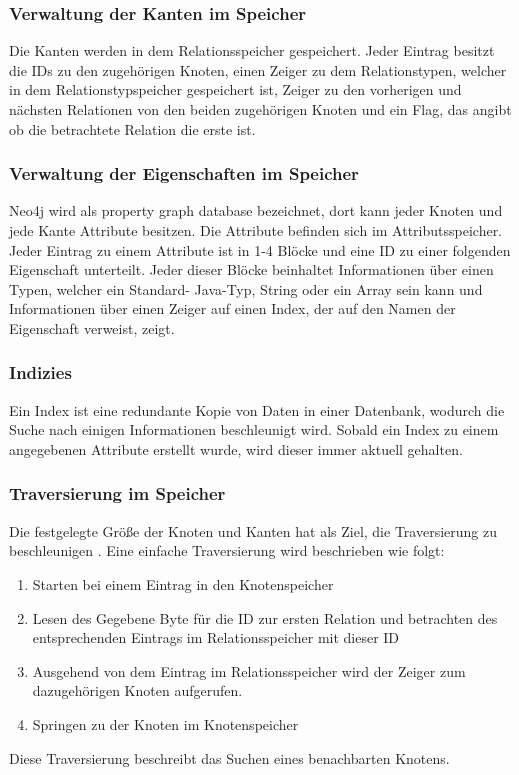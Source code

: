 \subsubsection{Verwaltung der Kanten im Speicher}
Die Kanten werden in dem Relationsspeicher gespeichert. Jeder Eintrag besitzt die IDs zu den zugehörigen Knoten, einen Zeiger zu dem Relationstypen, welcher in dem Relationstypspeicher gespeichert ist, Zeiger zu den vorherigen und nächsten Relationen von den beiden zugehörigen Knoten und ein Flag, das angibt ob die betrachtete Relation die erste ist. \newline
\subsubsection{Verwaltung der Eigenschaften im Speicher}
Neo4j wird als property graph database bezeichnet, dort kann jeder Knoten und jede Kante Attribute besitzen. Die Attribute befinden sich im Attributsspeicher. Jeder Eintrag zu einem Attribute ist in 1-4 Blöcke und eine ID zu einer folgenden Eigenschaft unterteilt. Jeder dieser Blöcke beinhaltet Informationen über einen Typen, welcher ein Standard- Java-Typ, String oder ein Array sein kann und Informationen über einen Zeiger auf einen Index, der auf den Namen der Eigenschaft verweist, zeigt.  \newline
\subsubsection{Indizies}
Ein Index ist eine redundante Kopie von Daten in einer Datenbank, wodurch die Suche nach einigen Informationen beschleunigt wird. Sobald ein Index zu einem angegebenen Attribute erstellt wurde, wird dieser immer aktuell gehalten.  	
\subsubsection {Traversierung im Speicher}
Die festgelegte Größe der Knoten und Kanten hat als Ziel, die Traversierung zu beschleunigen \parencite{robinson2013graph}. Eine einfache Traversierung wird beschrieben wie folgt: 
\begin{enumerate}
	\item Starten bei einem Eintrag in den Knotenspeicher
	\item Lesen des Gegebene Byte für die ID zur ersten Relation und betrachten des entsprechenden Eintrags im Relationsspeicher mit dieser ID
	\item Ausgehend von dem Eintrag im Relationsspeicher wird der Zeiger zum dazugehörigen Knoten aufgerufen.
	\item Springen zu der Knoten im Knotenspeicher
\end{enumerate}
Diese Traversierung beschreibt das Suchen eines benachbarten Knotens.
